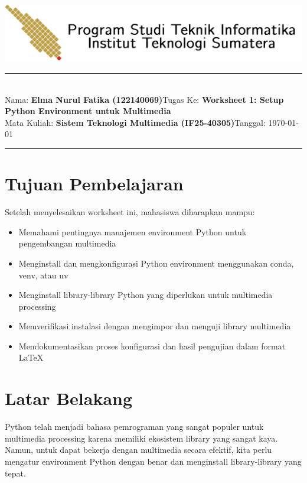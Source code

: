 \documentclass[11pt,a4paper]{article}
\newcommand{\student}{\textbf{Elma Nurul Fatika (122140069)}}
\newcommand{\course}{\textbf{Sistem Teknologi Multimedia (IF25-40305)}}
\newcommand{\assignment}{\textbf{Worksheet 1: Setup Python Environment untuk Multimedia}}
\begin{document}
\thispagestyle{empty}
\begin{center}
	\includegraphics[scale = 0.15]{Figure/ifitera-header.png}
	\vspace{0.1cm}
\end{center}
\noindent
\rule{17cm}{0.2cm}\\[0.3cm]
Nama: \student \hfill Tugas Ke: \assignment\\[0.1cm]
Mata Kuliah: \course \hfill Tanggal: \today\\
\rule{17cm}{0.05cm}
\vspace{0.1cm}



\section{Tujuan Pembelajaran}
Setelah menyelesaikan worksheet ini, mahasiswa diharapkan mampu:
\begin{itemize}
    \item Memahami pentingnya manajemen environment Python untuk pengembangan multimedia
    \item Menginstall dan mengkonfigurasi Python environment menggunakan conda, venv, atau uv
    \item Menginstall library-library Python yang diperlukan untuk multimedia processing
    \item Memverifikasi instalasi dengan mengimpor dan menguji library multimedia
    \item Mendokumentasikan proses konfigurasi dan hasil pengujian dalam format \LaTeX
\end{itemize}

\section{Latar Belakang}
Python telah menjadi bahasa pemrograman yang sangat populer untuk multimedia processing karena memiliki ekosistem library yang sangat kaya. Namun, untuk dapat bekerja dengan multimedia secara efektif, kita perlu mengatur environment Python dengan benar dan menginstall library-library yang tepat.
\end{document}
